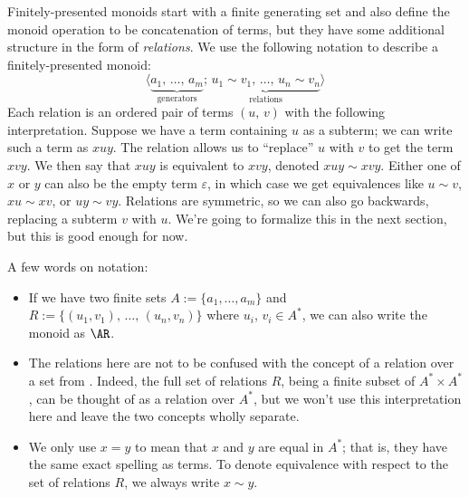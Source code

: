 \documentclass[../generics]{subfiles}
\begin{document}
Finitely-presented monoids start with a finite generating set and also define the monoid operation to be concatenation of terms, but they have some additional structure in the form of \emph{relations}. We use the following notation to describe a finitely-presented monoid:
\[\langle \underbrace{a_1,\,\ldots,\, a_m}_{\text{generators}};\, \underbrace{u_1 \sim v_1,\,\ldots,\, u_n \sim v_n}_{\text{relations}}\rangle\]
Each relation is an ordered pair of terms $(u,\,v)$ with the following interpretation. Suppose we have a term containing $u$ as a subterm; we can write such a term as $xuy$. The relation allows us to ``replace'' $u$ with $v$ to get the term $xvy$. We then say that $xuy$ is equivalent to $xvy$, denoted $xuy\sim xvy$. Either one of $x$ or $y$ can also be the empty term $\varepsilon$, in which case we get equivalences like $u\sim v$, $xu\sim xv$, or $uy\sim vy$. Relations are symmetric, so we can also go backwards, replacing a subterm $v$ with $u$. We're going to formalize this in the next section, but this is good enough for now.

A few words on notation:
\begin{itemize}
\item If we have two finite sets $A := \{a_1,\ldots, a_m\}$ and $R := \{(u_1,v_1),\,\ldots,\,(u_n,v_n)\}$ where $u_i$, $v_i\in A^*$, we can also write the monoid as $\AR$.
\item The relations here are not to be confused with the concept of a relation over a set from . Indeed, the full set of relations $R$, being a finite subset of $A^*\times A^*$, can be thought of as a relation over $A^*$, but we won't use this interpretation here and leave the two concepts wholly separate.
\item We only use $x=y$ to mean that $x$ and $y$ are equal in $A^*$; that is, they have the same exact spelling as terms. To denote equivalence with respect to the set of relations $R$, we always write $x\sim y$.
\end{itemize}
\end{document}

